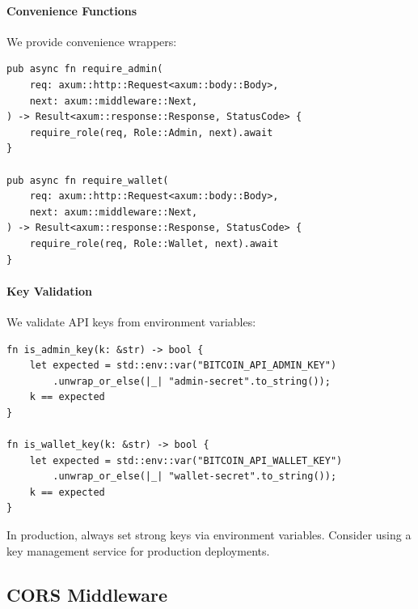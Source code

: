 \paragraph{Convenience Functions}

We provide convenience wrappers:

\begin{listing}[htbp]
\caption{Authentication middleware convenience functions}
\label{lst:middleware-auth-convenience}
\begin{verbatim}
pub async fn require_admin(
    req: axum::http::Request<axum::body::Body>,
    next: axum::middleware::Next,
) -> Result<axum::response::Response, StatusCode> {
    require_role(req, Role::Admin, next).await
}

pub async fn require_wallet(
    req: axum::http::Request<axum::body::Body>,
    next: axum::middleware::Next,
) -> Result<axum::response::Response, StatusCode> {
    require_role(req, Role::Wallet, next).await
}
\end{verbatim}
\end{listing}

\paragraph{Key Validation}

We validate API keys from environment variables:

\begin{listing}[htbp]
\caption{API key validation from environment}
\label{lst:middleware-key-validation}
\begin{verbatim}
fn is_admin_key(k: &str) -> bool {
    let expected = std::env::var("BITCOIN_API_ADMIN_KEY")
        .unwrap_or_else(|_| "admin-secret".to_string());
    k == expected
}

fn is_wallet_key(k: &str) -> bool {
    let expected = std::env::var("BITCOIN_API_WALLET_KEY")
        .unwrap_or_else(|_| "wallet-secret".to_string());
    k == expected
}
\end{verbatim}
\end{listing}

\begin{warnbox}
In production, always set strong keys via environment variables. Consider using a key management service for production deployments.
\end{warnbox}

\subsection{CORS Middleware}


